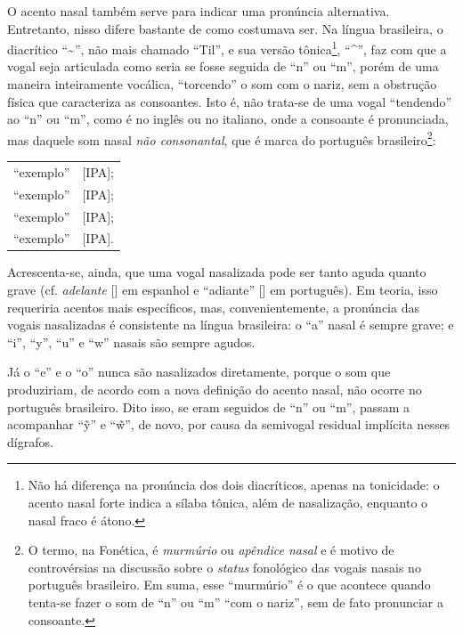 \documentclass[12pt, a5paper, titlepage]{article}
\begin{document}
O acento nasal também serve para indicar uma pronúncia alternativa. Entretanto, nisso difere bastante de como costumava ser. Na língua brasileira, o diacrítico ``\textasciitilde'', não mais chamado ``Til'', e sua versão tônica\footnote{
    Não há diferença na pronúncia dos dois diacríticos, apenas na tonicidade: o acento nasal forte indica a sílaba tônica, além de nasalização, enquanto o nasal fraco é átono.
}, ``\textasciicircum'', faz com que a vogal seja articulada como seria se fosse seguida de ``n'' ou ``m'', porém de uma maneira inteiramente vocálica, ``torcendo'' o som com o nariz, sem a obstrução física que caracteriza as consoantes. Isto é, não trata-se de uma vogal ``tendendo'' ao ``n'' ou ``m'', como é no inglês ou no italiano, onde a consoante é pronunciada, mas daquele som nasal \textit{não consonantal}, que é marca do português brasileiro\footnote{
    O termo, na Fonética, é \textit{murmúrio} ou \textit{apêndice nasal} e é motivo de controvérsias na discussão sobre o \textit{status} fonológico das vogais nasais no português brasileiro. Em suma, esse ``murmúrio'' é o que acontece quando tenta-se fazer o som de ``n'' ou ``m'' ``com o nariz'', sem de fato pronunciar a consoante.
}:

\begin{center}
    \begin{tabular}{ll}
        ``exemplo'' &[IPA];
        \\
        ``exemplo'' &[IPA];
        \\
        ``exemplo'' &[IPA];
        \\
        ``exemplo'' &[IPA].
    \end{tabular}
\end{center}

Acrescenta-se, ainda, que uma vogal nasalizada pode ser tanto aguda quanto grave (cf. \textit{adelante} [] em espanhol e ``adiante'' [] em português). Em teoria, isso requeriria acentos mais específicos, mas, convenientemente, a pronúncia das vogais nasalizadas é consistente na língua brasileira: o ``a'' nasal é sempre grave; e ``i'', ``y'', ``u'' e ``w'' nasais são sempre agudos. 

Já o ``e'' e o ``o'' nunca são nasalizados diretamente, porque o som que produziriam, de acordo com a nova definição do acento nasal, não ocorre no português brasileiro. Dito isso, se eram seguidos de ``n'' ou ``m'', passam a acompanhar ``\~y'' e ``\~w'', de novo, por causa da semivogal residual implícita nesses dígrafos.
\end{document}
